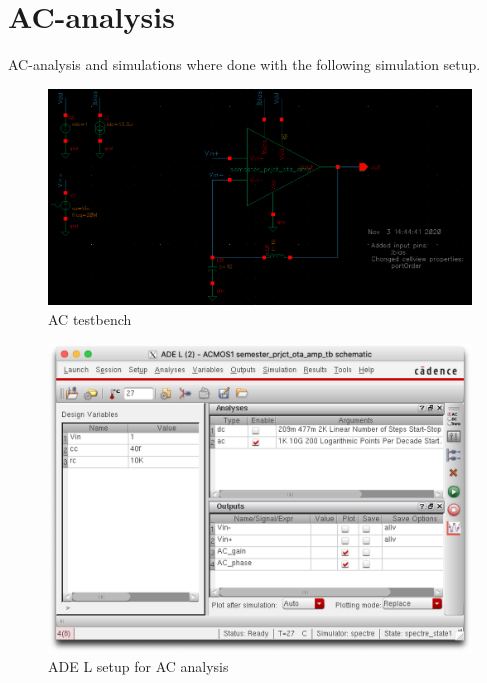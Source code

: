 \section{AC-analysis}
AC-analysis and simulations where done with the following simulation setup.
\begin{figure}[!htbp]
    \centering
    \includegraphics[width=.9\linewidth]{Images/Virtuoso/AC_tb.png}
    \caption{AC testbench}
    \label{fig:AC:tb}
\end{figure}
\begin{figure}[ht]
    \centering
    \includegraphics[width=.9\linewidth]{Images/Virtuoso/AC_stimuli.png}
    \caption{ADE L setup for AC analysis}
    \label{fig:ADE:AC}
\end{figure}

